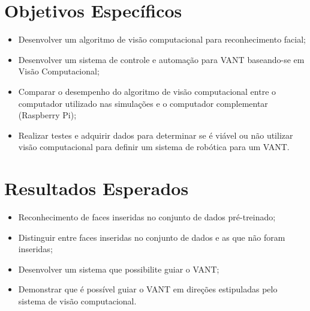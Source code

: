 
\section{Objetivos Específicos}
\begin{itemize}
	\item Desenvolver um algoritmo de visão computacional para reconhecimento facial;
	\item Desenvolver um sistema de controle e automação para VANT baseando-se em Visão Computacional;
	\item Comparar o desempenho do algoritmo de visão computacional entre o computador utilizado nas simulações e o computador complementar (Raspberry Pi);
	\item Realizar testes e adquirir dados para determinar se é viável ou não utilizar visão computacional para definir um sistema de robótica para um VANT.
\end{itemize}

\section{Resultados Esperados}

\begin{itemize}
	\item Reconhecimento de faces inseridas no conjunto de dados pré-treinado;
	\item Distinguir entre faces inseridas no conjunto de dados e as que não foram inseridas;
	\item Desenvolver um sistema que possibilite guiar o VANT;
	\item Demonstrar que é possível guiar o VANT em direções estipuladas pelo sistema de visão computacional.
	
\end{itemize}


